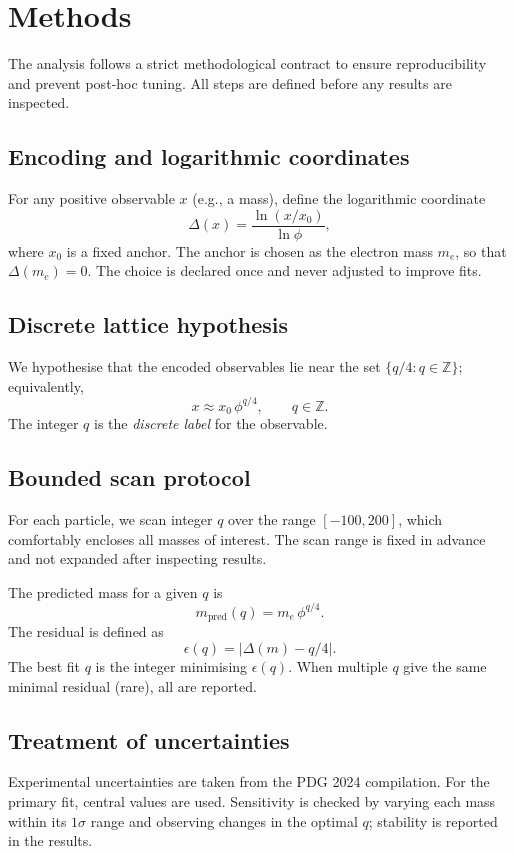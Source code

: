 \documentclass[12pt]{article}
\theoremstyle{definition}
\begin{document}
\section{Methods}
\label{sec:methods}

The analysis follows a strict methodological contract to ensure reproducibility and prevent post‑hoc tuning. All steps are defined before any results are inspected.

\subsection{Encoding and logarithmic coordinates}
For any positive observable $x$ (e.g., a mass), define the logarithmic coordinate
\[
\Delta(x) = \frac{\ln(x/x_0)}{\ln\phi},
\]
where $x_0$ is a fixed anchor. The anchor is chosen as the electron mass $m_e$, so that $\Delta(m_e)=0$. The choice is declared once and never adjusted to improve fits.

\subsection{Discrete lattice hypothesis}
We hypothesise that the encoded observables lie near the set $\{q/4 : q\in\mathbb{Z}\}$; equivalently,
\[
x \approx x_0 \,\phi^{q/4},\qquad q\in\mathbb{Z}.
\]
The integer $q$ is the \emph{discrete label} for the observable.

\subsection{Bounded scan protocol}
For each particle, we scan integer $q$ over the range $[-100,200]$, which comfortably encloses all masses of interest. The scan range is fixed in advance and not expanded after inspecting results.

The predicted mass for a given $q$ is
\[
m_{\text{pred}}(q) = m_e \,\phi^{q/4}.
\]
The residual is defined as
\[
\epsilon(q) = \bigl|\Delta(m) - q/4\bigr|.
\]
The best fit $q$ is the integer minimising $\epsilon(q)$. When multiple $q$ give the same minimal residual (rare), all are reported.

\subsection{Treatment of uncertainties}
Experimental uncertainties are taken from the PDG 2024 compilation. For the primary fit, central values are used. Sensitivity is checked by varying each mass within its $1\sigma$ range and observing changes in the optimal $q$; stability is reported in the results.
\end{document}
